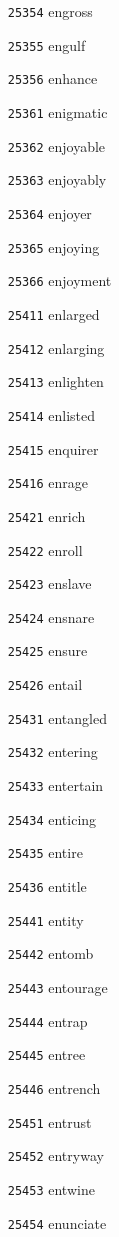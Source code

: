 \documentclass[twoside,11pt]{article}
\begin{document}
\begin{multicols}{5}
\begin{enumerate}
\item[\texttt{25354}] engross
\item[\texttt{25355}] engulf
\item[\texttt{25356}] enhance
\item[\texttt{25361}] enigmatic
\item[\texttt{25362}] enjoyable
\item[\texttt{25363}] enjoyably
\item[\texttt{25364}] enjoyer
\item[\texttt{25365}] enjoying
\item[\texttt{25366}] enjoyment
\item[\texttt{25411}] enlarged
\item[\texttt{25412}] enlarging
\item[\texttt{25413}] enlighten
\item[\texttt{25414}] enlisted
\item[\texttt{25415}] enquirer
\item[\texttt{25416}] enrage
\item[\texttt{25421}] enrich
\item[\texttt{25422}] enroll
\item[\texttt{25423}] enslave
\item[\texttt{25424}] ensnare
\item[\texttt{25425}] ensure
\item[\texttt{25426}] entail
\item[\texttt{25431}] entangled
\item[\texttt{25432}] entering
\item[\texttt{25433}] entertain
\item[\texttt{25434}] enticing
\item[\texttt{25435}] entire
\item[\texttt{25436}] entitle
\item[\texttt{25441}] entity
\item[\texttt{25442}] entomb
\item[\texttt{25443}] entourage
\item[\texttt{25444}] entrap
\item[\texttt{25445}] entree
\item[\texttt{25446}] entrench
\item[\texttt{25451}] entrust
\item[\texttt{25452}] entryway
\item[\texttt{25453}] entwine
\item[\texttt{25454}] enunciate

\end{enumerate}
\end{multicols}
\end{document}
